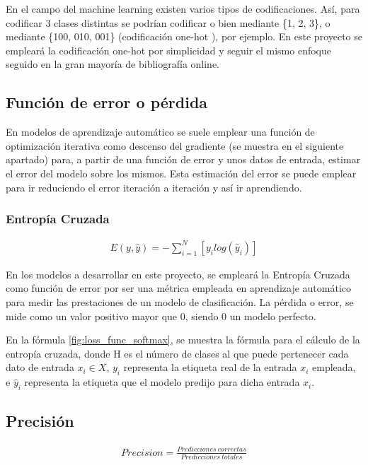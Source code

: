 En el campo del machine learning existen varios tipos de codificaciones. Así, para codificar 3 clases distintas se podrían codificar o bien mediante \{1, 2, 3\}, o mediante \{100, 010, 001\} (codificación one-hot \cite{one_hot}), por ejemplo. En este proyecto se empleará la codificación one-hot por simplicidad y seguir el mismo enfoque seguido en la gran mayoría de bibliografía online.

\subsection{Función de error o pérdida}

En modelos de aprendizaje automático se suele emplear una función de optimización iterativa como descenso del gradiente (se muestra en el siguiente apartado) para, a partir de una función de error y unos datos de entrada, estimar el error del modelo sobre los mismos. Esta estimación del error se puede emplear para ir reduciendo el error iteración a iteración y así ir aprendiendo. 

\subsubsection{Entropía Cruzada}

\begin{gather}
	E(y, \hat{y}) = - \sum_{i=1}^{N}  [y_i log( \hat{y}_i)]
	\label{fig:loss_func_softmax}
\end{gather}

En los modelos a desarrollar en este proyecto, se empleará la Entropía Cruzada como función de error por ser una métrica empleada en aprendizaje automático para medir las prestaciones de un modelo de clasificación. La pérdida o error, se mide como un valor positivo mayor que 0, siendo 0 un modelo perfecto. \cite{Cross_entropy}

En la fórmula \ref{fig:loss_func_softmax}, se muestra la fórmula para el cálculo de la entropía cruzada, donde H es el número de clases al que puede pertenecer cada dato de entrada $x_i \in X$, $y_i$ representa la etiqueta real de la entrada $x_i$ empleada, e $\hat{y}_i$ representa la etiqueta que el modelo predijo para dicha entrada $x_i$.  \\

\subsection{Precisión}

\begin{gather}
	Precision = \frac{Predicciones\ correctas}{Predicciones\ totales}
	\label{accuracy_formula}
\end{gather}


